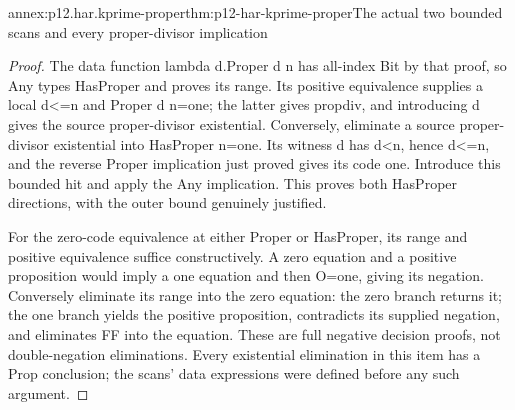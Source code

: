 \begin{annexitem}{annex:p12.har.kprime-proper}{thm:p12-har-kprime-proper}{The actual two bounded scans and every proper-divisor implication}
\begin{proof}
The data function lambda d.Proper d n has all-index Bit by that
proof, so Any types HasProper and proves its range. Its positive
equivalence supplies a local d<=n and Proper d n=one; the latter
gives propdiv, and introducing d gives the source proper-divisor
existential. Conversely, eliminate a source proper-divisor existential
into HasProper n=one. Its witness d has d<n, hence d<=n, and
the reverse Proper implication just proved gives its code one.
Introduce this bounded hit and apply the Any implication. This proves
both HasProper directions, with the outer bound genuinely justified.

For the zero-code equivalence at either Proper or HasProper, its
range and positive equivalence suffice constructively. A zero equation
and a positive proposition would imply a one equation and then O=one,
giving its negation. Conversely eliminate its range into the zero
equation: the zero branch returns it; the one branch yields the
positive proposition, contradicts its supplied negation, and eliminates
FF into the equation. These are full negative decision proofs, not
double-negation eliminations. Every existential elimination in this
item has a Prop conclusion; the scans' data expressions were defined
before any such argument.
\end{proof}
\end{annexitem}

